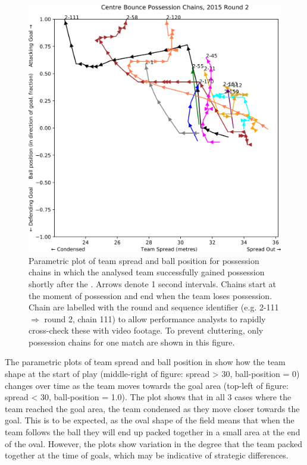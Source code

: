 \begin{figure}[!htb]
\centering
\includegraphics[width=0.9\linewidth]{figs/paper/2018-cb-r2.png}
\caption{Parametric plot of team spread and ball position for possession chains in which the analysed team successfully gained possession shortly after the \centrebounce{}. Arrows denote 1 second intervals. Chains start at the moment of possession and end when the team loses possession. Chain are labelled with the round and sequence identifier (e.g. 2-111 $\Rightarrow$ round 2, chain 111) to allow performance analysts to rapidly cross-check these with video footage. To prevent cluttering, only possession chains for one match are shown in this figure.}
\label{fig:2018-cb-r2}
\end{figure}

The parametric plots of team spread and ball position in  show how the team shape at the start of play (middle-right of figure: spread > 30, ball-position = 0) changes over time as the team moves towards the goal area (top-left of figure: spread < 30, ball-position = 1.0). The plot shows that in all 3 cases where the team reached the goal area, the team condensed as they move closer towards the goal. This is to be expected, as the oval shape of the field means that when the team follows the ball they will end up packed together in a small area at the end of the oval. However, the plots show variation in the degree that the team packed together at the time of goals, which may be indicative of strategic differences.

